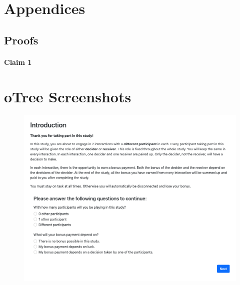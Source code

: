 \documentclass[11pt]{article}
\theoremstyle{plainCl1}
\begin{document}
\section{Appendices}

\subsection{Proofs}

\paragraph{Claim 1}







\section{oTree Screenshots}

\begin{figure}[h]
\centering
\includegraphics[scale=0.5]{welcome}
\end{figure}
\end{document}
